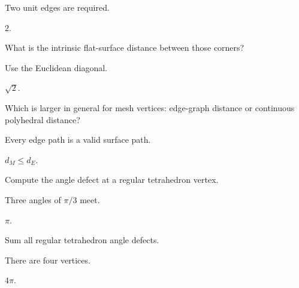 \begin{hint}
Two unit edges are required.
\end{hint}

\begin{solution}
\(2\).
\end{solution}

\begin{exercise}\label{exr:vii38-ped-02}
What is the intrinsic flat-surface distance between those corners?
\end{exercise}

\begin{hint}
Use the Euclidean diagonal.
\end{hint}

\begin{solution}
\(\sqrt2\).
\end{solution}

\begin{exercise}\label{exr:vii38-ped-03}
Which is larger in general for mesh vertices: edge-graph distance or continuous polyhedral distance?
\end{exercise}

\begin{hint}
Every edge path is a valid surface path.
\end{hint}

\begin{solution}
\(d_M\le d_E\).
\end{solution}

\begin{exercise}\label{exr:vii38-ped-04}
Compute the angle defect at a regular tetrahedron vertex.
\end{exercise}

\begin{hint}
Three angles of \(\pi/3\) meet.
\end{hint}

\begin{solution}
\(\pi\).
\end{solution}

\begin{exercise}\label{exr:vii38-ped-05}
Sum all regular tetrahedron angle defects.
\end{exercise}

\begin{hint}
There are four vertices.
\end{hint}

\begin{solution}
\(4\pi\).
\end{solution}

